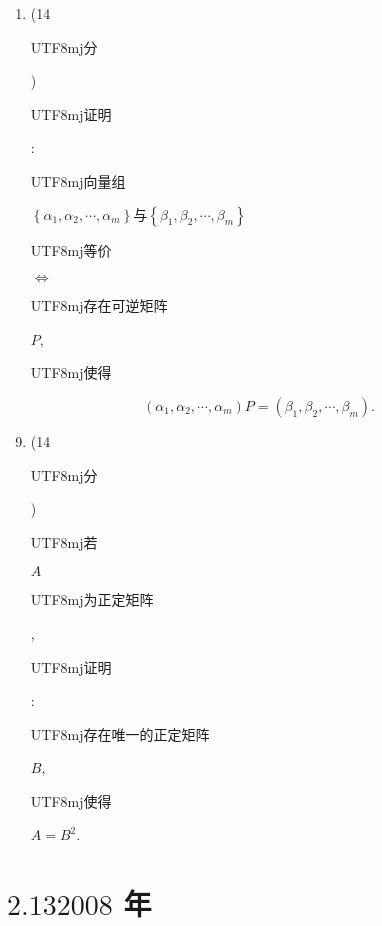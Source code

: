 \documentclass[10pt]{article}
\begin{document}
\begin{enumerate}
  \item (14 \begin{CJK}{UTF8}{mj}分\end{CJK}) \begin{CJK}{UTF8}{mj}证明\end{CJK}: \begin{CJK}{UTF8}{mj}向量组\end{CJK} $\left\{\alpha_{1}, \alpha_{2}, \cdots, \alpha_{m}\right\} 与\left\{\beta_{1}, \beta_{2}, \cdots, \beta_{m}\right\}$ \begin{CJK}{UTF8}{mj}等价\end{CJK} $\Leftrightarrow$ \begin{CJK}{UTF8}{mj}存在可逆矩阵\end{CJK} $P$, \begin{CJK}{UTF8}{mj}使得\end{CJK}

\end{enumerate}
$$
\left(\alpha_{1}, \alpha_{2}, \cdots, \alpha_{m}\right) P=\left(\beta_{1}, \beta_{2}, \cdots, \beta_{m}\right) .
$$

\begin{enumerate}
  \setcounter{enumi}{8}
  \item (14 \begin{CJK}{UTF8}{mj}分\end{CJK}) \begin{CJK}{UTF8}{mj}若\end{CJK} $A$ \begin{CJK}{UTF8}{mj}为正定矩阵\end{CJK}, \begin{CJK}{UTF8}{mj}证明\end{CJK}: \begin{CJK}{UTF8}{mj}存在唯一的正定矩阵\end{CJK} $B$, \begin{CJK}{UTF8}{mj}使得\end{CJK} $A=B^{2}$.
\end{enumerate}
\section{$2.132008$ 年}
\end{document}
